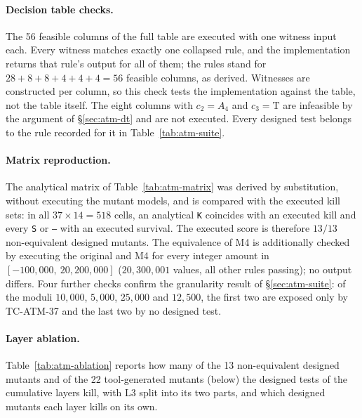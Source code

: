 \documentclass[11pt,a4paper]{article}
\begin{document}
\paragraph{Decision table checks.} The 56 feasible columns of the full table
are executed with one witness input each. Every witness matches exactly one
collapsed rule, and the implementation returns that rule's output for all
of them; the rules stand for \(28+8+8+4+4+4=56\) feasible columns, as
derived. Witnesses are constructed per column, so this check tests the
implementation against the table, not the table itself. The eight columns
with \(c_2=A_4\) and \(c_3=\mathrm{T}\) are infeasible by the argument of
\S\ref{sec:atm-dt} and are not executed. Every designed test belongs to the
rule recorded for it in Table~\ref{tab:atm-suite}.

\paragraph{Matrix reproduction.} The analytical matrix of
Table~\ref{tab:atm-matrix} was derived by substitution, without executing the
mutant models, and is compared with the executed kill sets: in all
\(37\times14=518\) cells, an analytical \texttt{K} coincides with an executed
kill and every \texttt{S} or \texttt{--} with an executed survival. The
executed score is therefore \(13/13\) non-equivalent designed mutants. The
equivalence of M4 is additionally checked by executing the original and M4
for every integer amount in \([-100{,}000,\ 20{,}200{,}000]\)
(\(20{,}300{,}001\) values, all other rules passing); no output differs. Four
further checks confirm the granularity result of \S\ref{sec:atm-suite}: of
the moduli \(10{,}000\), \(5{,}000\), \(25{,}000\) and \(12{,}500\), the first two
are exposed only by TC-ATM-37 and the last two by no designed test.

\paragraph{Layer ablation.} Table~\ref{tab:atm-ablation} reports how many of
the 13 non-equivalent designed mutants and of the 22 tool-generated mutants
(below) the designed tests of the cumulative layers kill, with L3 split into
its two parts, and which designed mutants each layer kills on its own.
\end{document}
